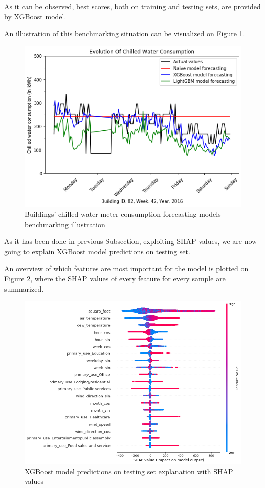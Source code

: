 \documentclass[twocolumn, switch]{article}
\begin{document}
As it can be observed, best scores, both on training and testing sets, are provided by XGBoost model.

An illustration of this benchmarking situation can be visualized on Figure \ref{fig:chilled_water_benchmarking_illustration}.

\begin{figure}[H]
\centering
\includegraphics[scale=0.35]{../graphs/sample_chilled_water_consumption_comparison}
\caption{Buildings' chilled water meter consumption forecasting models benchmarking illustration}
\label{fig:chilled_water_benchmarking_illustration}
\end{figure}

As it has been done in previous Subsection, exploiting SHAP values, we are now going to explain XGBoost model predictions on testing set.

An overview of which features are most important for the model is plotted on Figure \ref{fig:shap_values_summary_plot_chilled_water}, where the SHAP values of every feature for every sample are summarized.

\begin{figure}[H]
\centering
\includegraphics[scale=0.3]{../graphs/shap_values_summary_plot_chilled_water}
\caption{XGBoost model predictions on testing set explanation with SHAP values}
\label{fig:shap_values_summary_plot_chilled_water}
\end{figure}
\end{document}
